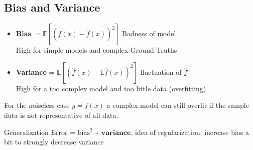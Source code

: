 \subsection{Bias and Variance}

\begin{itemize}
    \item \textbf{Bias} $= \mathbb{E}\left[(f(x) - \hat{f}(x))^2\right]$ Badness of model\\
    High for simple models and complex Ground Truths
    \item \textbf{Variance} = $\mathbb{E}\left[(\hat{f}(x) - \mathbb{E}\hat{f}(x))^2\right]$ fluctuation of $\hat{f}$\\
    High for a too complex model and too little data (overfitting)\\
\end{itemize}

For the noiseless case $y = f(x)$ a complex model can still overfit if the sample data is not representative of all data.

Generalization Error = $\text{bias}^2 + \textbf{variance}$, idea of regularization: increase bias a bit to strongly decrease variance







